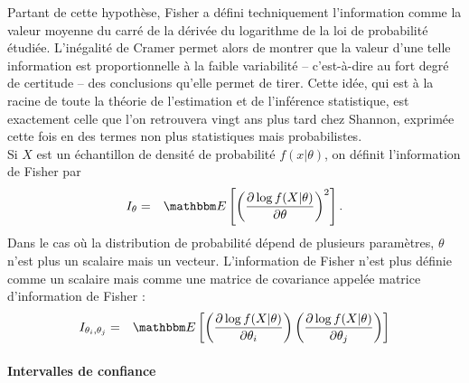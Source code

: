 Partant de cette hypoth\`ese, Fisher a d\'efini techniquement l'information comme la valeur moyenne du carr\'e de la d\'eriv\'ee du logarithme de la loi de probabilit\'e \'etudi\'ee. L'in\'egalit\'e de Cramer permet alors de montrer que la valeur d'une telle information est proportionnelle \`a la faible variabilit\'e -- c'est-\`a-dire au fort degr\'e de certitude -- des conclusions qu'elle permet de tirer. Cette id\'ee, qui est \`a la racine de toute la th\'eorie de l'estimation et de l'inf\'erence statistique, est exactement celle que l'on retrouvera vingt ans plus tard chez Shannon, exprim\'ee cette fois en des termes non plus statistiques mais probabilistes. \\

Si $X$ est un \'echantillon de densit\'e de probabilit\'e $f(x|\theta)$, on d\'efinit l'information de Fisher par 
	\begin{eqnarray*}
	I_{\theta} & = & \E\left[\left(\frac{\partial\log f(X|\theta)}{\partial \theta}\right)^2\right]. 
	\end{eqnarray*}
	Dans le cas o\`u la distribution de probabilit\'e d\'epend de plusieurs param\`etres, $\theta$ n'est plus un scalaire mais un vecteur. %
	L'information de Fisher n'est plus d\'efinie comme un scalaire mais comme une matrice de covariance appel\'ee matrice d'information de Fisher :
		\begin{eqnarray*}
	I_{\theta_i,\theta_j} & = & \E\left[\left(\frac{\partial\log f(X|\theta)}{\partial \theta_i}\right)\left(\frac{\partial\log f(X|\theta)}{\partial \theta_j}\right)\right] 
	\end{eqnarray*}

\paragraph{Intervalles de confiance}\label{interv.conf}

